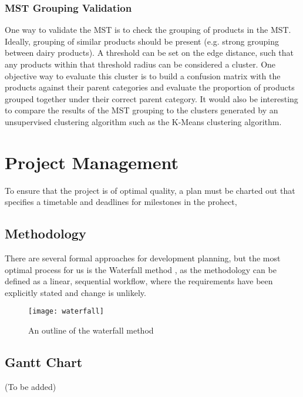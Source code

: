 \documentclass[a4paper,11pt]{article}
\begin{document}
\subsubsection*{MST Grouping Validation}
One way to validate the MST is to check the grouping of products in the MST. Ideally,  grouping of similar products should be present (e.g. strong grouping between dairy products). A threshold can be set on the edge distance, such that any products within that threshold radius can be considered a cluster.  One objective way to evaluate this cluster is to build a confusion matrix with the products against their parent categories and evaluate the proportion of products grouped together under their correct parent category. It would also be interesting to compare the results of the MST grouping to the clusters generated by an unsupervised clustering algorithm such as the K-Means clustering algorithm.

\newpage
\section{Project Management}
To ensure that the project is of optimal quality,  a plan must be charted out that specifies a timetable and deadlines for milestones in the prohect,
\subsection{Methodology}
There are several formal approaches for development planning,  but the most optimal process for us is the Waterfall method \cite{waterfall}, as the methodology can be defined as a linear, sequential workflow, where the requirements have been explicitly stated and change is unlikely.
\begin{figure}[H]
\centering
\texttt{[image: waterfall]}
\caption{An outline of the waterfall method}\label{fig:waterfall}
\end{figure}

\subsection{Gantt Chart}
(To be added)
\end{document}
